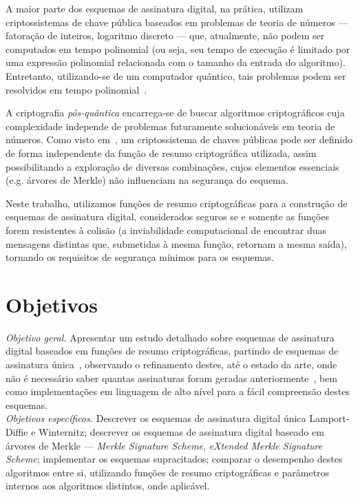 \documentclass{ufsctex/ufsctex}
\begin{document}
A maior parte dos esquemas de assinatura digital, na prática, utilizam
criptossistemas de chave pública baseados em problemas de teoria de números ---
fatoração de inteiros, logaritmo discreto --- que, atualmente, não podem ser
computados em tempo polinomial (ou seja, seu tempo de execução é limitado por
uma expressão polinomial relacionada com o tamanho da entrada do algoritmo).
Entretanto, utilizando-se de um computador quântico, tais problemas podem ser
resolvidos em tempo polinomial~\cite{Shor:1997:PAP:264393.264406}.

A criptografia \emph{pós-quântica} encarrega-se de buscar algoritmos
criptográficos cuja complexidade independe de problemas futuramente
solucionáveis em teoria de números. Como visto
em~\cite{Merkle:1989:CDS:118209.118230}, um criptossistema de chaves públicas
pode ser definido de forma independente da função de resumo criptográfica
utilizada, assim possibilitando a exploração de diversas combinações, cujos
elementos essenciais (e.g. árvores de Merkle) não influenciam na segurança do
esquema.

Neste trabalho, utilizamos funções de resumo criptográficas para a construção
de esquemas de assinatura digital, considerados seguros se e somente as funções
forem resistentes à colisão (a inviabilidade computacional de encontrar duas
mensagens distintas que, submetidas à mesma função, retornam a mesma saída),
tornando os requisitos de segurança mínimos para os esquemas.

\section{Objetivos}

\noindent \emph{Objetivo geral.} Apresentar um estudo detalhado sobre esquemas
de assinatura digital baseados em funções de resumo criptográficas, partindo de
esquemas de assinatura única~\cite{lamport1979constructing}, observando o
refinamento destes, até o estado da arte, onde não é necessário saber quantas
assinaturas foram geradas anteriormente~\cite{Bernstein2015}, bem como
implementações em linguagem de alto nível para a fácil compreensão destes
esquemas. \\

\noindent \emph{Objetivos específicos.} Descrever os esquemas de assinatura
digital única Lamport-Diffie e Winternitz; descrever os esquemas de assinatura
digital baseado em árvores de Merkle --- \emph{Merkle Signature Scheme},
\emph{eXtended Merkle Signature Scheme}; implementar os esquemas supracitados;
comparar o desempenho destes algoritmos entre si, utilizando funções de resumo
criptográficas e parâmetros internos aos algoritmos distintos, onde aplicável.
\\
\end{document}
